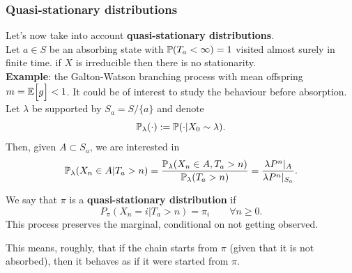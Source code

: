 \documentclass{article}
\begin{document}
\subsubsection{Quasi-stationary distributions}
Let's now take into account \textbf{quasi-stationary distributions}.\\
Let $a\in S$ be an absorbing state with $\mathbb{P}(T_a<\infty)=1$ visited almost surely in finite time. if $X$ is irreducible then there is no stationarity.\\
\textbf{Example}: the Galton-Watson branching process with mean offspring $m=\mathbb{E}\Bigl[{g}\Bigr]<1$.
It could be of interest to study the behaviour before absorption.\\
Let $\lambda$ be supported by $S_a=S/\{a\}$ and denote\[\mathbb{P}_\lambda(\cdot):=\mathbb{P}(\cdot|X_0\sim\lambda).\] Then, given $A\subset S_a$, we are interested in 
\[\mathbb{P}_\lambda(X_n\in A|T_a>n)=\frac{\mathbb{P}_\lambda(X_n\in A,T_a>n)}{\mathbb{P}_\lambda(T_a>n)}=\frac{\lambda P^n|_A}{\lambda P^n|_{S_a}}.\]
\begin{definition}
     We say that $\pi$ is a \textbf{quasi-stationary distribution} if
        \[
        P_\pi (X_n=i|T_a>n)=\pi_i\qquad \forall n \geqslant 0.
        \]
        This process preserves the marginal, conditional on not getting observed.
\end{definition}
This means, roughly, that if the chain starts from $\pi$ (given that it is not absorbed), then it behaves as if it were started from $\pi$.
\end{document}
